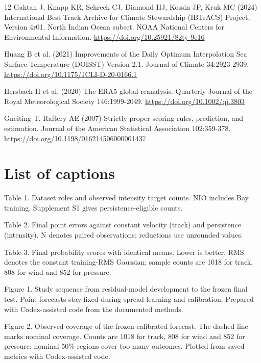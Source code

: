 \documentclass[pdflatex,sn-mathphys-num,referee,a4paper]{sn-jnl}
\begin{document}
\begin{thebibliography}{12}
Gahtan J, Knapp KR, Schreck CJ, Diamond HJ, Kossin JP, Kruk MC (2024) International Best Track Archive for Climate Stewardship (IBTrACS) Project, Version 4r01. North Indian Ocean subset. NOAA National Centers for Environmental Information. \url{https://doi.org/10.25921/82ty-9e16}

Huang B et al. (2021) Improvements of the Daily Optimum Interpolation Sea Surface Temperature (DOISST) Version 2.1. Journal of Climate 34:2923-2939. \url{https://doi.org/10.1175/JCLI-D-20-0166.1}

Hersbach H et al. (2020) The ERA5 global reanalysis. Quarterly Journal of the Royal Meteorological Society 146:1999-2049. \url{https://doi.org/10.1002/qj.3803}

Gneiting T, Raftery AE (2007) Strictly proper scoring rules, prediction, and estimation. Journal of the American Statistical Association 102:359-378. \url{https://doi.org/10.1198/016214506000001437}

\end{thebibliography}
\clearpage
\section*{List of captions}
Table 1. Dataset roles and observed intensity target counts. NIO includes Bay training. Supplement S1 gives persistence-eligible counts.

Table 2. Final point errors against constant velocity (track) and persistence (intensity). N denotes paired observations; reductions use unrounded values.

Table 3. Final probability scores with identical means. Lower is better. RMS denotes the constant training-RMS Gaussian; sample counts are 1018 for track, 808 for wind and 852 for pressure.

Figure 1. Study sequence from residual-model development to the frozen final test. Point forecasts stay fixed during spread learning and calibration. Prepared with Codex-assisted code from the documented methods.

Figure 2. Observed coverage of the frozen calibrated forecast. The dashed line marks nominal coverage. Counts are 1018 for track, 808 for wind and 852 for pressure; nominal 50\% regions cover too many outcomes. Plotted from saved metrics with Codex-assisted code.
\end{document}
